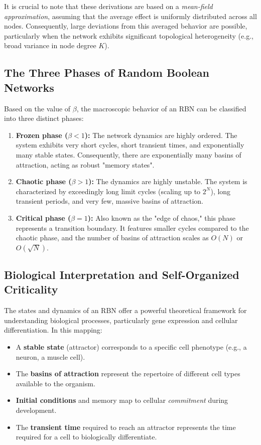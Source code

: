 It is crucial to note that these derivations are based on a \textit{mean-field approximation}, assuming that the average effect is uniformly distributed across all nodes. Consequently, large deviations from this averaged behavior are possible, particularly when the network exhibits significant topological heterogeneity (e.g., broad variance in node degree \(K\)).

\subsection{The Three Phases of Random Boolean Networks}
\label{subsec:rbn_three_phases}

Based on the value of \(\beta\), the macroscopic behavior of an RBN can be classified into three distinct phases:
\begin{enumerate}
    \item \textbf{Frozen phase (\(\beta < 1\)):} The network dynamics are highly ordered. The system exhibits very short cycles, short transient times, and exponentially many stable states. Consequently, there are exponentially many basins of attraction, acting as robust "memory states".
    \item \textbf{Chaotic phase (\(\beta > 1\)):} The dynamics are highly unstable. The system is characterized by exceedingly long limit cycles (scaling up to \(2^N\)), long transient periods, and very few, massive basins of attraction.
    \item \textbf{Critical phase (\(\beta = 1\)):} Also known as the "edge of chaos," this phase represents a transition boundary. It features smaller cycles compared to the chaotic phase, and the number of basins of attraction scales as \(O(N)\) or \(O(\sqrt{N})\).
\end{enumerate}

\subsection{Biological Interpretation and Self-Organized Criticality}
\label{subsec:biological_interpretation}

The states and dynamics of an RBN offer a powerful theoretical framework for understanding biological processes, particularly gene expression and cellular differentiation. In this mapping:
\begin{itemize}
    \item A \textbf{stable state} (attractor) corresponds to a specific cell phenotype (e.g., a neuron, a muscle cell).
    \item The \textbf{basins of attraction} represent the repertoire of different cell types available to the organism.
    \item \textbf{Initial conditions} and memory map to cellular \textit{commitment} during development.
    \item The \textbf{transient time} required to reach an attractor represents the time required for a cell to biologically differentiate.
\end{itemize}


